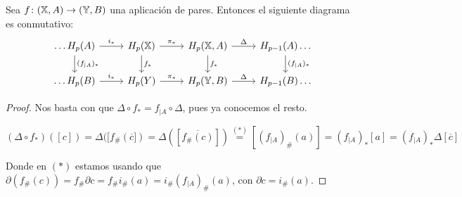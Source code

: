 \begin{proposition}
  Sea $f \colon ({\mathbb X}, A) \to ({\mathbb Y}, B)$ una aplicación de pares. Entonces el siguiente diagrama es conmutativo:
  \[  \begin{tikzcd}
    \dots H_p(A) \arrow{r}{i_*} \arrow{d}{(f_{|A})_*} & H_p(\X) \arrow{r}{\pi_*} \arrow{d}{f_*} & H_p(\X, A) \arrow{r}{\Delta} \arrow{d}{f_*} & H_{p-1}(A) \dots \arrow{d}{(f_{|A})_*} \\
    \dots H_p(B) \arrow{r}{i_*} & H_p(Y) \arrow{r}{\pi_*} & H_p(\Y, B) \arrow{r}{\Delta} & H_{p-1}(B) \dots
  \end{tikzcd} \]
\end{proposition}

\begin{proof}
  Nos basta con que $\Delta \circ f_* = f_{|A} \circ \Delta$, pues ya conocemos el resto.

  $
    (\Delta \circ f_*)([c]) = \Delta([f_\#(\overline{c}]) = \Delta([\overline{f_\#(c)}]) \stackrel{(*)}{=} [(f_{|A})_\#(a)]
    = (f_{|A})_*[a] = (f_{|A})_* \Delta[\overline{c}]
  $

  Donde en $(*)$ estamos usando que $\partial(f_\#(c)) = f_\# \partial c = f_\# i_\#(a) = i_\#(f_{|A})_\#(a)$, con $\partial c = i_\#(a).$
\end{proof}
